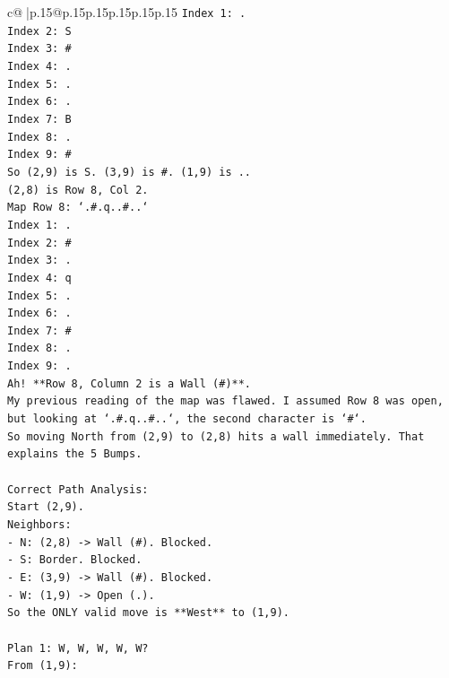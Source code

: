 \documentclass{article}
\begin{document}
{\begin{supertabular}{c@{$\;$}|p{.15\linewidth}@{}p{.15\linewidth}p{.15\linewidth}p{.15\linewidth}p{.15\linewidth}p{.15\linewidth}}
{{{\texttt{Index 1: .} \\
\texttt{Index 2: S} \\
\texttt{Index 3: \#} \\
\texttt{Index 4: .} \\
\texttt{Index 5: .} \\
\texttt{Index 6: .} \\
\texttt{Index 7: B} \\
\texttt{Index 8: .} \\
\texttt{Index 9: \#} \\
\texttt{So (2,9) is S. (3,9) is \#. (1,9) is ..} \\
\texttt{(2,8) is Row 8, Col 2.} \\
\texttt{Map Row 8: `.\#.q..\#..`} \\
\texttt{Index 1: .} \\
\texttt{Index 2: \#} \\
\texttt{Index 3: .} \\
\texttt{Index 4: q} \\
\texttt{Index 5: .} \\
\texttt{Index 6: .} \\
\texttt{Index 7: \#} \\
\texttt{Index 8: .} \\
\texttt{Index 9: .} \\
\texttt{Ah! **Row 8, Column 2 is a Wall (\#)**.} \\
\texttt{My previous reading of the map was flawed. I assumed Row 8 was open, but looking at `.\#.q..\#..`, the second character is `\#`.} \\
\texttt{So moving North from (2,9) to (2,8) hits a wall immediately. That explains the 5 Bumps.} \\
\\ 
\texttt{Correct Path Analysis:} \\
\texttt{Start (2,9).} \\
\texttt{Neighbors:} \\
\texttt{{-} N: (2,8) {-}> Wall (\#). Blocked.} \\
\texttt{{-} S: Border. Blocked.} \\
\texttt{{-} E: (3,9) {-}> Wall (\#). Blocked.} \\
\texttt{{-} W: (1,9) {-}> Open (.).} \\
\texttt{So the ONLY valid move is **West** to (1,9).} \\
\\ 
\texttt{Plan 1: W, W, W, W, W?} \\
\texttt{From (1,9):} \\
}}}
\end{supertabular}}
\end{document}
